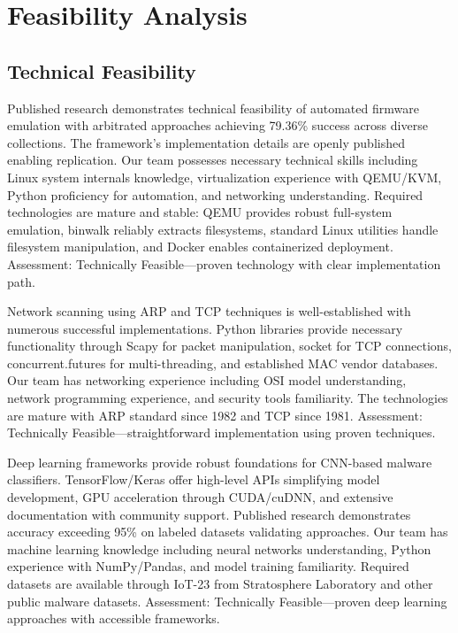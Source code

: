 \section{Feasibility Analysis}

\subsection{Technical Feasibility}

Published research demonstrates technical feasibility of automated firmware emulation with arbitrated approaches achieving 79.36\% success across diverse collections. The framework's implementation details are openly published enabling replication. Our team possesses necessary technical skills including Linux system internals knowledge, virtualization experience with QEMU/KVM, Python proficiency for automation, and networking understanding. Required technologies are mature and stable: QEMU provides robust full-system emulation, binwalk reliably extracts filesystems, standard Linux utilities handle filesystem manipulation, and Docker enables containerized deployment. Assessment: Technically Feasible---proven technology with clear implementation path.

Network scanning using ARP and TCP techniques is well-established with numerous successful implementations. Python libraries provide necessary functionality through Scapy for packet manipulation, socket for TCP connections, concurrent.futures for multi-threading, and established MAC vendor databases. Our team has networking experience including OSI model understanding, network programming experience, and security tools familiarity. The technologies are mature with ARP standard since 1982 and TCP since 1981. Assessment: Technically Feasible---straightforward implementation using proven techniques.

Deep learning frameworks provide robust foundations for CNN-based malware classifiers. TensorFlow/Keras offer high-level APIs simplifying model development, GPU acceleration through CUDA/cuDNN, and extensive documentation with community support. Published research demonstrates accuracy exceeding 95\% on labeled datasets validating approaches. Our team has machine learning knowledge including neural networks understanding, Python experience with NumPy/Pandas, and model training familiarity. Required datasets are available through IoT-23 from Stratosphere Laboratory and other public malware datasets. Assessment: Technically Feasible---proven deep learning approaches with accessible frameworks.

